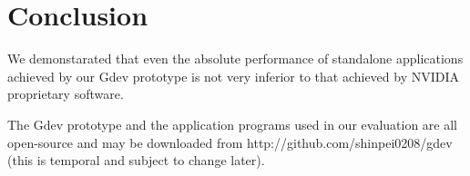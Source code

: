\section{Conclusion}
\label{sec:conclusion}

We demonstarated that even the absolute performance of standalone
applications achieved by our Gdev prototype is not very inferior to that
achieved by NVIDIA proprietary software. 

The Gdev prototype and the application programs used in our evaluation
are all open-source and may be downloaded from
{\sf http://github.com/shinpei0208/gdev} (this is temporal and subject
to change later).
